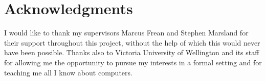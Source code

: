 \chapter*{Acknowledgments}\label{C:ack} 

I would like to thank my supervisors Marcus Frean and Stephen Marsland for their support throughout this project, without the help of which this would never have been possible. Thanks also to Victoria University of Wellington and its staff for allowing me the opportunity to pursue my interests in a formal setting and for teaching me all I know about computers.

